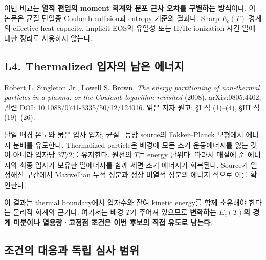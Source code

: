 이번 비교는 \textbf{열적 편입의 moment 회계와 분포 근사 오차를 구별하는 방식}이다. 이 논문은 균질 단일종 Coulomb collision과 entropy 기준의 결과다. Sharp \(E_c(T)\) 경계의 effective heat capacity, implicit EOS의 유일성 또는 H/He ionization 사건 열에 대한 정리로 사용하지 않는다.

\hypertarget{l4.-thermalized-uxc785uxc790uxc758-uxb0a8uxc740-uxc5d0uxb108uxc9c0}{%
\subsection{L4. Thermalized 입자의 남은 에너지}\label{l4.-thermalized-uxc785uxc790uxc758-uxb0a8uxc740-uxc5d0uxb108uxc9c0}}

Robert L. Singleton Jr., Lowell S. Brown, \emph{The energy partitioning of non-thermal particles in a plasma: or the Coulomb logarithm revisited} (2008). \href{https://arxiv.org/abs/0805.4402}{arXiv:0805.4402}, \href{https://doi.org/10.1088/0741-3335/50/12/124016}{관련 DOI: 10.1088/0741-3335/50/12/124016}. 읽은 \href{https://ar5iv.labs.arxiv.org/html/0805.4402}{저자 원고}: §I 식 (1)--(4), §III 식 (19)--(26).

단일 배경 온도와 묽은 입사 입자, 균질·등방 source의 Fokker--Planck 모형에서 에너지 분배를 유도한다. Thermalized particle은 배경에 모든 초기 운동에너지를 잃는 것이 아니라 입자당 \(3T/2\)를 유지한다. 원전의 \(T\)는 energy 단위다. 따라서 매질에 준 에너지와 최종 입자가 보유한 열에너지를 함께 세면 초기 에너지가 회복된다. Source가 일정해진 구간에서 Maxwellian 누적 성분과 정상 비열적 성분의 에너지 식으로 이를 확인한다.

이 결과는 thermal boundary에서 입자수와 잔여 kinetic energy를 함께 소유해야 한다는 물리적 회계의 근거다. 여기서는 배경 \(T\)가 주어져 있으므로 \textbf{변화하는 \(E_c(T)\)의 경계 미분이나 열용량·고정점 조건은 이번 후보의 직접 유도로 남는다}.

\hypertarget{uxc870uxac74uxc758-uxb300uxc751uxacfc-uxb3c5uxb9bd-uxc2ecuxc0ac-uxbc94uxc704}{%
\subsection{조건의 대응과 독립 심사 범위}\label{uxc870uxac74uxc758-uxb300uxc751uxacfc-uxb3c5uxb9bd-uxc2ecuxc0ac-uxbc94uxc704}}


